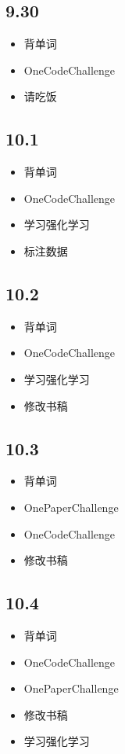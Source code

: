 \documentclass[UTF8]{ctexart}
\begin{document}
\subsection*{9.30}
\begin{itemize}
    \item 背单词
    \item OneCodeChallenge
    \item 请吃饭
\end{itemize}

\subsection*{10.1}
\begin{itemize}
    \item 背单词
    \item OneCodeChallenge
    \item 学习强化学习
    \item 标注数据
\end{itemize}

\subsection*{10.2}
\begin{itemize}
    \item 背单词
    \item OneCodeChallenge
    \item 学习强化学习
    \item 修改书稿
\end{itemize}

\subsection*{10.3}
\begin{itemize}
    \item 背单词
    \item OnePaperChallenge
    \item OneCodeChallenge
    \item 修改书稿
\end{itemize}

\subsection*{10.4}
\begin{itemize}
    \item 背单词
    \item OneCodeChallenge
    \item OnePaperChallenge
    \item 修改书稿
    \item 学习强化学习
\end{itemize}
\end{document}
